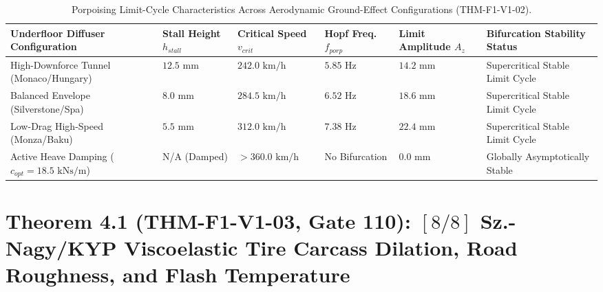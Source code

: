 \documentclass[11pt,a4paper,reqno]{article}
\def\texttt#1{#1}%
\def\mathrm#1{#1}%
\theoremstyle{plain}
\theoremstyle{definition}
\theoremstyle{remark}
\numberwithin{equation}{section}
\begin{document}
\begin{table}[H]
\centering
\caption{Porpoising Limit-Cycle Characteristics Across Aerodynamic Ground-Effect Configurations (\texttt{THM-F1-V1-02}).}
\label{tab:porpoising_characteristics}
\scriptsize
\setlength{\tabcolsep}{4pt}
\renewcommand{\arraystretch}{1.18}
\begin{tabularx}{\textwidth}{@{}p{3.4cm}p{2.2cm}p{2.2cm}p{2.2cm}p{2.2cm}Y@{}}
\toprule
\textbf{Underfloor Diffuser Configuration} & \textbf{Stall Height $h_{\mathrm{stall}}$} & \textbf{Critical Speed $v_{\mathrm{crit}}$} & \textbf{Hopf Freq.\ $f_{\mathrm{porp}}$} & \textbf{Limit Amplitude $A_z$} & \textbf{Bifurcation Stability Status} \\
\midrule
High-Downforce Tunnel (Monaco/Hungary) & $12.5\text{ mm}$ & $242.0\text{ km/h}$ & $5.85\text{ Hz}$ & $14.2\text{ mm}$ & Supercritical Stable Limit Cycle \\
Balanced Envelope (Silverstone/Spa) & $8.0\text{ mm}$ & $284.5\text{ km/h}$ & $6.52\text{ Hz}$ & $18.6\text{ mm}$ & Supercritical Stable Limit Cycle \\
Low-Drag High-Speed (Monza/Baku) & $5.5\text{ mm}$ & $312.0\text{ km/h}$ & $7.38\text{ Hz}$ & $22.4\text{ mm}$ & Supercritical Stable Limit Cycle \\
Active Heave Damping ($c_{\mathrm{opt}} = 18.5\text{ kNs/m}$) & N/A (Damped) & $> 360.0\text{ km/h}$ & No Bifurcation & $0.0\text{ mm}$ & Globally Asymptotically Stable \\
\bottomrule
\end{tabularx}
\end{table}

\section{\texorpdfstring{Theorem 4.1 (\texttt{THM-F1-V1-03}, Gate 110): $[8/8]$ Sz.-Nagy/KYP Viscoelastic Tire Carcass Dilation, Road Roughness, and Flash Temperature}{Theorem 4.1 (THM-F1-V1-03, Gate 110): [8/8] Sz.-Nagy/KYP Viscoelastic Tire Carcass Dilation, Road Roughness, and Flash Temperature}}
\end{document}
